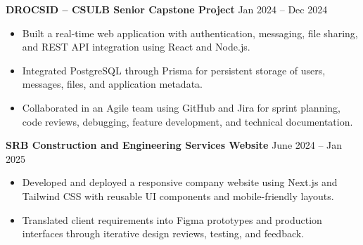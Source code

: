 \documentclass[a4paper,10pt]{article}
\newcommand{\dateright}[1]{%
  \hfill{\small\textnormal{#1}}%
}
\begin{document}
\textbf{DROCSID -- CSULB Senior Capstone Project}
\dateright{Jan 2024 -- Dec 2024}

\begin{itemize}
  \item Built a real-time web application with authentication, messaging, file sharing, and REST API integration using React and Node.js.
  
  \item Integrated PostgreSQL through Prisma for persistent storage of users, messages, files, and application metadata.
  
  \item Collaborated in an Agile team using GitHub and Jira for sprint planning, code reviews, debugging, feature development, and technical documentation.
\end{itemize}

\vspace{2pt}

\textbf{SRB Construction and Engineering Services Website}
\dateright{June 2024 -- Jan 2025}

\begin{itemize}
  \item Developed and deployed a responsive company website using Next.js and Tailwind CSS with reusable UI components and mobile-friendly layouts.
  
  \item Translated client requirements into Figma prototypes and production interfaces through iterative design reviews, testing, and feedback.
\end{itemize}
\end{document}
